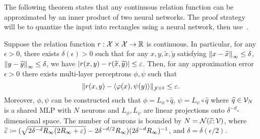 The following theorem states that any continuous relation function can be approximated by an inner product of two neural networks. The proof strategy will be to quantize the input into rectangles using a neural network, then use~.

\begin{theorem}\label{theorem:asymemtric_inner_prod_rel_func_class}
    Suppose the relation function $r: {\mathcal{X}} \times {\mathcal{X}} \to \mathbb{R}$ is continuous. In particular, for any $\epsilon > 0$, there exists $\delta(\epsilon) > 0$ such that for any $x, y, \tilde{x}, \tilde{y}$ satisfying $\left\lVert x - \widetilde{x}\right\rVert_{\infty} \leq \delta$, $\left\lVert y - \widetilde{y}\right\rVert_{\infty} \leq \delta$, we have $\left\lvert r(x, y) - r(\widetilde{x}, \widetilde{y})\right\rvert \leq \varepsilon$. Then, for any approximation error $\epsilon > 0$ there exists multi-layer perceptrons $\phi, \psi$ such that
    \begin{equation*}
        \norm{r(x,y) - \iprod{\phi(x)}{\psi(y)}}_{\calF^{\otimes 2}} \leq \epsilon.
    \end{equation*}
    Moreover, $\phi, \psi$ can be constructed such that $\phi = L_\phi \circ \hat{q}$, $\psi = L_\psi \circ \hat{q}$ where $\widehat{q} \in {\mathcal{V}}_N$ is a shared MLP with $N$ neurons and $L_\phi, L_\psi$ are linear projections onto $\delta^{-d}$-dimensional space. The number of neurons is bounded by $N = {\mathcal{N}}(\widetilde{\varepsilon}; {\mathcal{V}})$, where $\widetilde{\varepsilon} \coloneq (\sqrt{2 \delta^{-d} R_\infty (2 R_\infty + \varepsilon)} - 2 \delta^{-d / 2} R_\infty) (2 \delta^{-d} R_\infty)^{-1}$, and $\delta = \delta(\epsilon / 2)$.
\end{theorem}

